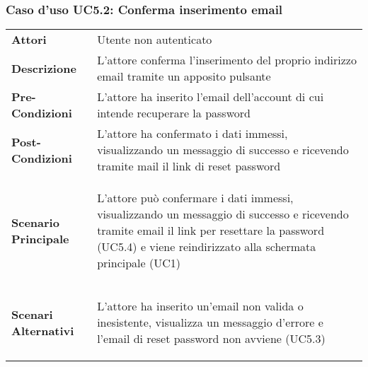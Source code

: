 \subsubsection{Caso d'uso UC5.2: Conferma inserimento email}
\label{UC5_2}

\begin{minipage}{\linewidth}
\begin{longtable}{ l | p{11cm}}
	\hline
	\rowcolor{Gray}
	 \multicolumn{2}{c}{UC5.2 - Conferma inserimento email} \\
	 \hline
	\textbf{Attori} & Utente non autenticato \\
	\textbf{Descrizione} & L'attore conferma l'inserimento del proprio indirizzo email tramite un apposito pulsante \\
	\textbf{Pre-Condizioni} & L'attore ha inserito l'email dell'account di cui intende recuperare la password \\
	\textbf{Post-Condizioni} & L'attore ha confermato i dati immessi, visualizzando un messaggio di successo e ricevendo tramite mail il link di reset password \\
	\textbf{Scenario Principale} & \begin{enumerate*}[label=(\arabic*.),itemjoin={\newline}]
		\item L'attore può confermare i dati immessi, visualizzando un messaggio di successo e ricevendo tramite email il link per resettare la password (UC5.4) e viene reindirizzato alla schermata principale (UC1)
	\end{enumerate*}\\
	\textbf{Scenari Alternativi} & 
	\begin{enumerate*}[label=(\arabic*.),itemjoin={\newline}]
		\item L'attore ha inserito un'email non valida o inesistente, visualizza un messaggio d'errore e l'email di reset password non avviene (UC5.3)
	\end{enumerate*}\\
\end{longtable}
\end{minipage}